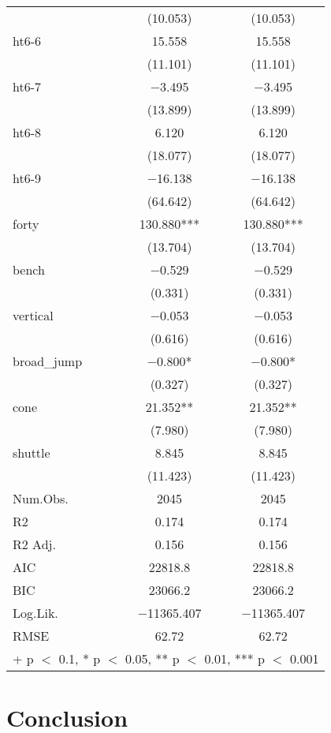\documentclass[12pt,english]{article}
\begin{document}
\begin{table}[ht]
\begin{tabular}{lcc}
 & (\num{10.053}) & (\num{10.053})\\
ht6-6 & \num{15.558} & \num{15.558}\\
 & (\num{11.101}) & (\num{11.101})\\
ht6-7 & \num{-3.495} & \num{-3.495}\\
 & (\num{13.899}) & (\num{13.899})\\
ht6-8 & \num{6.120} & \num{6.120}\\
 & (\num{18.077}) & (\num{18.077})\\
ht6-9 & \num{-16.138} & \num{-16.138}\\
 & (\num{64.642}) & (\num{64.642})\\
forty & \num{130.880}*** & \num{130.880}***\\
 & (\num{13.704}) & (\num{13.704})\\
bench & \num{-0.529} & \num{-0.529}\\
 & (\num{0.331}) & (\num{0.331})\\
vertical & \num{-0.053} & \num{-0.053}\\
 & (\num{0.616}) & (\num{0.616})\\
broad\_jump & \num{-0.800}* & \num{-0.800}*\\
 & (\num{0.327}) & (\num{0.327})\\
cone & \num{21.352}** & \num{21.352}**\\
 & (\num{7.980}) & (\num{7.980})\\
shuttle & \num{8.845} & \num{8.845}\\
 & (\num{11.423}) & (\num{11.423})\\
\midrule
Num.Obs. & \num{2045} & \num{2045}\\
R2 & \num{0.174} & \num{0.174}\\
R2 Adj. & \num{0.156} & \num{0.156}\\
AIC & \num{22818.8} & \num{22818.8}\\
BIC & \num{23066.2} & \num{23066.2}\\
Log.Lik. & \num{-11365.407} & \num{-11365.407}\\
RMSE & \num{62.72} & \num{62.72}\\
\bottomrule
\multicolumn{3}{l}{\rule{0pt}{1em}+ p $<$ 0.1, * p $<$ 0.05, ** p $<$ 0.01, *** p $<$ 0.001}\\
\end{tabular}
\end{table}

\section{Conclusion}\label{sec:conclusion}

\vfill
\pagebreak{}
\begin{spacing}{1.0}


\end{spacing}

\vfill
\pagebreak{}
\clearpage
\end{document}
